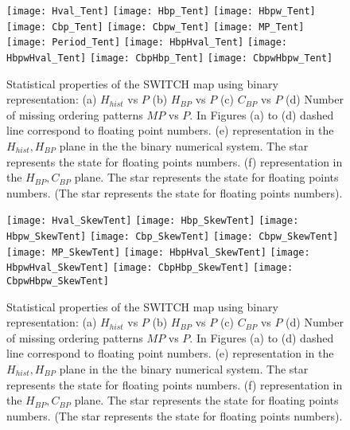 \begin{figure}
	\texttt{[image: Hval\_Tent]}
	\texttt{[image: Hbp\_Tent]}
	\texttt{[image: Hbpw\_Tent]}
	\texttt{[image: Cbp\_Tent]}
	\texttt{[image: Cbpw\_Tent]}
	\texttt{[image: MP\_Tent]}
	\texttt{[image: Period\_Tent]}
	\texttt{[image: HbpHval\_Tent]}
	\texttt{[image: HbpwHval\_Tent]}
	\texttt{[image: CbpHbp\_Tent]}
	\texttt{[image: CbpwHbpw\_Tent]}
	\caption{Statistical properties of the SWITCH map using binary representation: (a) $H_{hist}$ vs $P$ (b) $H_{BP}$ vs $P$ (c) $C_{BP}$ vs $P$ (d) Number of missing ordering patterns $MP$ vs $P$. In Figures (a) to (d) dashed line correspond to floating point numbers. (e) representation in the $H_{hist},H_{BP}$ plane in the the binary numerical system.  The star represents the state for floating points numbers. (f) representation in the $H_{BP},C_{BP}$ plane.  The star represents the state for floating points numbers. (The star represents the state for floating points numbers). } \label{fig:seqbin}
\end{figure}

\begin{figure}
	\texttt{[image: Hval\_SkewTent]}
	\texttt{[image: Hbp\_SkewTent]}
	\texttt{[image: Hbpw\_SkewTent]}
	\texttt{[image: Cbp\_SkewTent]}
	\texttt{[image: Cbpw\_SkewTent]}
	\texttt{[image: MP\_SkewTent]}
	\texttt{[image: HbpHval\_SkewTent]}
	\texttt{[image: HbpwHval\_SkewTent]}
	\texttt{[image: CbpHbp\_SkewTent]}
	\texttt{[image: CbpwHbpw\_SkewTent]}
	\caption{Statistical properties of the SWITCH map using binary representation: (a) $H_{hist}$ vs $P$ (b) $H_{BP}$ vs $P$ (c) $C_{BP}$ vs $P$ (d) Number of missing ordering patterns $MP$ vs $P$. In Figures (a) to (d) dashed line correspond to floating point numbers. (e) representation in the $H_{hist},H_{BP}$ plane in the the binary numerical system.  The star represents the state for floating points numbers. (f) representation in the $H_{BP},C_{BP}$ plane.  The star represents the state for floating points numbers. (The star represents the state for floating points numbers). } \label{fig:seqbin}
\end{figure}
